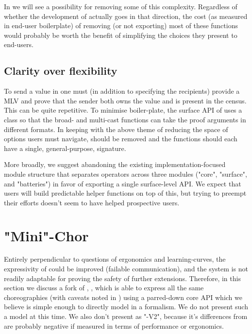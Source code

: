 In  we will see a possibility for removing some of this complexity.
Regardless of whether the development of \MultiChor actually goes in that direction,
the cost (as measured in end-user boilerplate) of removing (or not exporting) most of these functions
would probably be worth the benefit of simplifying the choices they present to end-users.

\subsection{Clarity over flexibility}

To send a value in \MultiChor one must (in addition to specifying the recipients)
provide a MLV and prove that the sender both owns the value and is present in the census.
This can be quite repetitive.
To minimise boiler-plate, the surface API of \MultiChor uses a class 
so that the broad- and multi-cast functions can take the proof arguments in different formats.
In keeping with the above theme of reducing the space of options users must navigate,
 should be removed and the functions should each have a single, general-purpose, signature.

More broadly, we suggest abandoning the existing implementation-focused module structure
that separates operators across three modules ("core", "surface", and "batteries")
in favor of exporting a single surface-level API.
We expect that users will build predictable helper functions on top of this,
but trying to preempt their efforts doesn't seem to have helped prospective users.

\section{"Mini"-Chor}
\label{sec:future-implementation}

Entirely perpendicular to questions of ergonomics and learning-curves, the expressivity of \MultiChor could be improved
(\eg failable communication),
and the \HLSCentral system is not readily adaptable for proving the safety of further extensions.
Therefore, in this section we discuss a fork of \MultiChor, \minichor,
which is able to express all the same choreographies (with caveats noted in )
using a parred-down core API which we believe is simple enough to directly model in a formalism.
We do not present such a model at this time.
We also don't present \minichor as "\MultiChor-V2",
because it's differences from \MultiChor are probably negative if measured in terms of performance or ergonomics.

